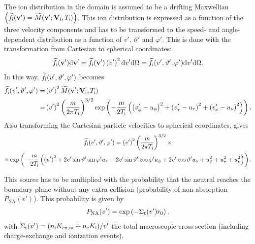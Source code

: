 The ion distribution in the domain is assumed to be a drifting Maxwellian $\left( \widetilde{f}_{\mathrm{i}}({\bf v}') = \widetilde{M}({\bf v}';{\bf V}_{\mathrm{i}},T_{\mathrm{i}}) \right)$. This ion distribution is expressed as a function of the three velocity components and has to be transformed to the speed- and angle-dependent distribution as a function of $v'$, $\vartheta'$ and $\varphi'$. This is done with the transformation from Cartesian to spherical coordinates:
\begin{equation}
\widetilde{f}_{\mathrm{i}}({\bf v}') \mathrm{d} {\bf v}' = \widetilde{f}_{\mathrm{i}}({\bf v}') \left (v' \right )^{2} \mathrm{d} v' \mathrm{d} \Omega = \widetilde{f}_{\mathrm{i}}(v',\vartheta',\varphi') \mathrm{d} v' \mathrm{d} \Omega.
\end{equation}
In this way, $\widetilde{f}_{\mathrm{i}}(v',\vartheta',\varphi')$ becomes
\begin{align}
\widetilde{f}_{\mathrm{i}}(v',\vartheta',\varphi') =& \left (v'\right )^{2} \widetilde{M}({\bf v}';{\bf V}_{\mathrm{i}},T_{\mathrm{i}}) \nonumber \\
=& \left (v'\right )^{2} \left( \frac{m}{2\pi T_{\mathrm{i}}} \right)^{3/2} \exp \left( -\frac{m}{2T_{\mathrm{i}}} \left( \left( v_{\phi}' - u_{\phi} \right)^{2} + \left(v_{\tau}' - u_{\tau} \right)^{2} + \left( v_{\nu}' - u_{\nu} \right)^{2} \right) \right).
\end{align}
Also transforming the Cartesian particle velocities to spherical coordinates, gives
\begin{multline}
\widetilde{f}_{\mathrm{i}}(v',\vartheta',\varphi') = \left (v' \right)^{2} \left( \frac{m}{2\pi T_{\mathrm{i}}}\right)^{3/2} \times \\
\times \exp \left( -\frac{m}{2T_{\mathrm{i}}} \left( \left( v' \right)^{2} + 2 v' \sin \vartheta' \sin \varphi' u_{\tau} + 2 v' \sin \vartheta' \cos \varphi' u_{\phi} + 2 v' \cos \vartheta' u_{\nu} + u_{\phi}^{2} + u_{\tau}^{2} + u_{\nu}^{2} \right) \right). \label{eq:finorm}
\end{multline}

\noindent This source has to be multiplied with the probability that the neutral reaches the boundary plane without any extra collision (probability of non-absorption $P_{\mathrm{NA}}(v')$). This probability is given by
\begin{equation}
P_{\mathrm{NA}}(v') = \exp \left( -\Sigma_{\mathrm{t}}(v') r_{0} \right), \label{eq:PNA}
\end{equation}
with $\Sigma_{\mathrm{t}}(v') = (n_{\mathrm{i}}K_{\mathrm{cx,m}} + n_{\mathrm{e}}K_{\mathrm{i}})/v'$ the total macroscopic cross-section (including charge-exchange and ionization events).

